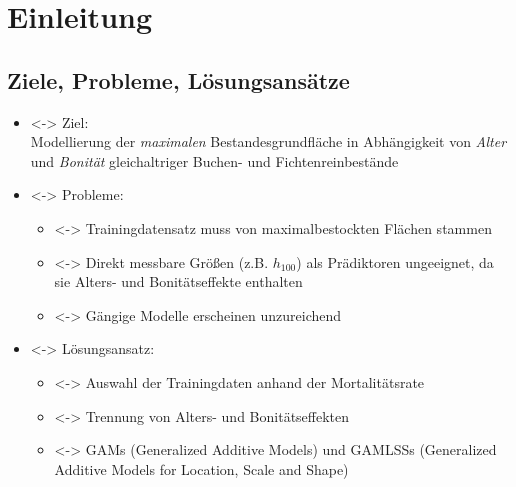 \section{Einleitung}
\subsection{Ziele, Probleme, Lösungsansätze}
\begin{frame}[t]

  \begin{itemize}
  \item<\thefirstElement-> Ziel: \\
    Modellierung der \emph{maximalen} Bestandesgrundfläche in Abhängigkeit von \emph{Alter} und \emph{Bonität} gleichaltriger Buchen- und Fichtenreinbestände
  \item<\thesecondElement-> Probleme:
    \begin{itemize}
    \item<\thesecondElement-> Trainingdatensatz muss von maximalbestockten Flächen stammen
    \item<\thesecondElement-> Direkt messbare Größen (z.B. \(h_{100}\)) als Prädiktoren ungeeignet, da sie Alters- und Bonitätseffekte enthalten
    \item<\thesecondElement-> Gängige Modelle erscheinen unzureichend
    \end{itemize}
  \end{itemize}
  \begin{itemize}
  \item<\thethirdElement-> Lösungsansatz:
    \begin{itemize}
    \item<\thethirdElement-> Auswahl der Trainingdaten anhand der Mortalitätsrate
    \item<\thethirdElement-> Trennung von Alters- und Bonitätseffekten
    \item<\thethirdElement-> GAMs (Generalized Additive Models) und GAMLSSs (Generalized Additive Models for Location, Scale and Shape)
    \end{itemize}
  \end{itemize}
\end{frame}

